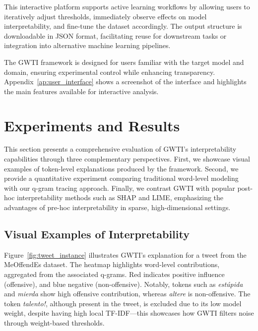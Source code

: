 \documentclass[runningheads,10pt]{llncs}
\begin{document}
This interactive platform supports active learning workflows by allowing users to iteratively adjust thresholds, immediately observe effects on model interpretability, and fine-tune the dataset accordingly. The output structure is downloadable in JSON format, facilitating reuse for downstream tasks or integration into alternative machine learning pipelines.

The \ac{GWTI} framework is designed for users familiar with the target model and domain, ensuring experimental control while enhancing transparency. Appendix~\ref{ap:user_interface} shows a screenshot of the interface and highlights the main features available for interactive analysis.


\section{Experiments and Results}
\label{sec:experiments}

This section presents a comprehensive evaluation of \ac{GWTI}’s interpretability capabilities through three complementary perspectives. First, we showcase visual examples of token-level explanations produced by the framework. Second, we provide a quantitative experiment comparing traditional word-level modeling with our q-gram tracing approach. Finally, we contrast \ac{GWTI} with popular post-hoc interpretability methods such as \ac{SHAP} and \ac{LIME}, emphasizing the advantages of pre-hoc interpretability in sparse, high-dimensional settings.

\subsection{Visual Examples of Interpretability}

Figure~\ref{fig:tweet_instance} illustrates \ac{GWTI}'s explanation for a tweet from the MeOffendEs dataset. The heatmap highlights word-level contributions, aggregated from the associated q-grams. Red indicates positive influence (offensive), and blue negative (non-offensive). Notably, tokens such as \textit{estúpida} and \textit{mierda} show high offensive contribution, whereas \textit{altere} is non-offensive. The token \textit{talento!}, although present in the tweet, is excluded due to its low model weight, despite having high local TF-IDF—this showcases how \ac{GWTI} filters noise through weight-based thresholds.
\end{document}
